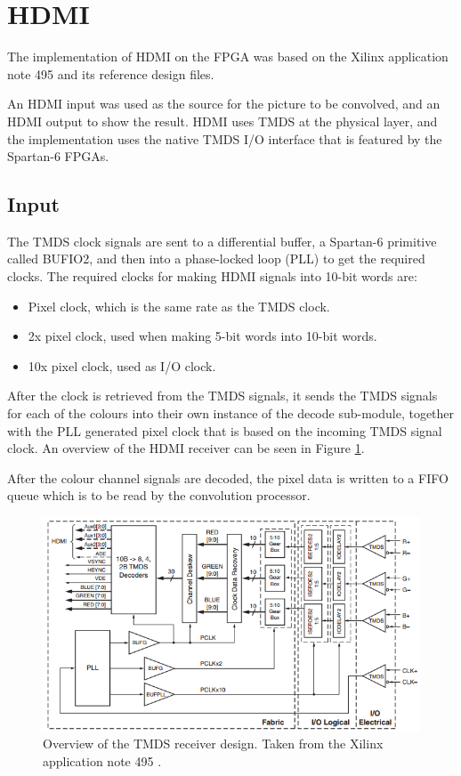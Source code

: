 \section{HDMI}
The implementation of HDMI on the FPGA was based on the Xilinx application note 495 \cite{xapp495} and its reference design files.

An HDMI input was used as the source for the picture to be convolved, and an HDMI output to show the result.
HDMI uses TMDS at the physical layer, and the implementation uses the native TMDS I/O interface that is featured by the Spartan-6 FPGAs.

\subsection{Input}
The TMDS clock signals are sent to a differential buffer, a Spartan-6 primitive called BUFIO2, and then into a phase-locked loop (PLL) to get the required clocks. The required clocks for making HDMI signals into 10-bit words are:
\begin{itemize}
    \item   Pixel clock, which is the same rate as the TMDS clock.
    \item   2x pixel clock, used when making 5-bit words into 10-bit words.
    \item   10x pixel clock, used as I/O clock.
\end{itemize}

After the clock is retrieved from the TMDS signals, it sends the TMDS signals for each of the colours into their own instance of the decode sub-module, together with the PLL generated pixel clock that is based on the incoming TMDS signal clock.
An overview of the HDMI receiver can be seen in Figure \ref{fig:TMDSReceiver}.

After the colour channel signals are decoded, the pixel data is written to a FIFO queue which is to be read by the convolution processor.

\begin{figure}[h!]
    \centering
    \includegraphics[width=\linewidth]{img/TMDSreceiverdesign.png}
    \caption[Overview of the TMDS receiver design]{Overview of the TMDS receiver design. Taken from the Xilinx application note 495 \cite{xapp495}.}
    \label{fig:TMDSReceiver}
\end{figure}


